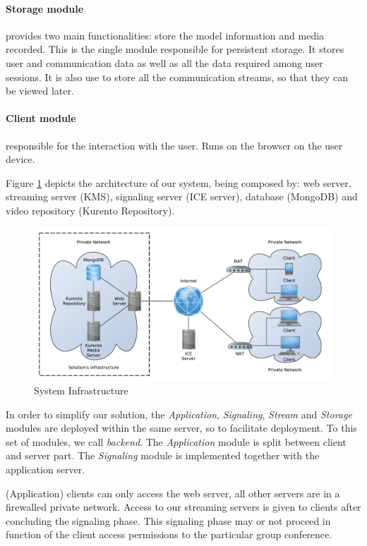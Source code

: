 \documentclass[10pt,conference]{IEEEtran}
\begin{document}
\paragraph{Storage module} provides two main functionalities: store the model information and media recorded. This is the single module responsible for persistent storage. It stores user and communication data as well as all the data required among user sessions. It is also use to store all the communication streams, so that they can be viewed later.

\paragraph{Client module} responsible for the interaction with the user. Runs on the browser on the user device.



Figure \ref{fig:infrastructure} depicts the architecture of our system, being composed by: web server, streaming server (\gls{KMS}), signaling server (\gls{ICE} server), database (MongoDB) and video repository (Kurento Repository).

\begin{figure}
	\centering
	\includegraphics[width=\linewidth]{figures/infrastructure.pdf}
	\caption{System Infrastructure}
        \label{fig:infrastructure}
\end{figure}

In order to simplify our solution, the \emph{Application}, \emph{Signaling}, \emph{Stream} and \emph{Storage} modules are deployed within the same  server, so to facilitate deployment.
To this set of modules, we call \emph{backend}.
The \emph{Application} module is split between client and server part.
The \emph{Signaling} module is implemented together with the application server.

(Application) clients can only access the web server, all other servers are in a firewalled private network.
Access to our streaming servers is given to clients after concluding the signaling phase.
This signaling phase may or not proceed in function of the client access permissions to the particular group conference.
\end{document}
